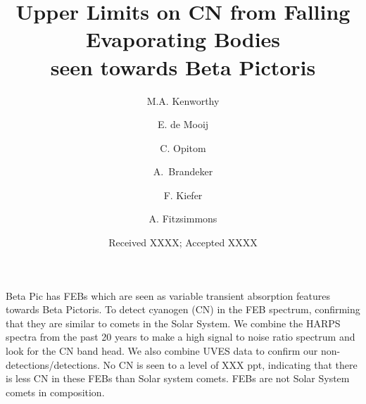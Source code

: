 \documentclass{aa}
\begin{document}
 


   \title{Upper Limits on CN from Falling Evaporating Bodies\\seen towards Beta Pictoris}

   \author{M.A. Kenworthy
          \and
          E. de Mooij
          \and
          C. Opitom
          \and
          A.\ Brandeker
          \and 
          F. Kiefer
          \and
          A. Fitzsimmons 
          }


   \date{Received XXXX; Accepted XXXX}

 
  \abstract
   {Beta Pic has FEBs which are seen as variable transient absorption features towards Beta Pictoris.}
   {To detect cyanogen (CN) in the FEB spectrum, confirming that they are similar to comets in the Solar System.}
   {We combine the HARPS spectra from the past 20 years to make a high signal to noise ratio spectrum and look for the CN band head. We also combine UVES data to confirm our non-detections/detections.}
   {No CN is seen to a level of XXX ppt, indicating that there is less CN in these FEBs than Solar system comets.}
   {FEBs are not Solar System comets in composition.}


   \maketitle
%
\end{document}

